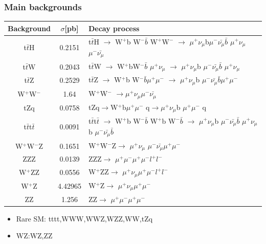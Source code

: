 \documentclass[11pt]{beamer}
\begin{document}
\begin{frame}
\frametitle{Main backgrounds}
\begin{center}
\scriptsize{
\begin{tabular}{|c|c|p{7cm}|}
	\hline
	Background & $\sigma$[pb] & Decay process \\
	\hline
t$\bar{t}$H	& 0.2151 & t$\bar{t}$H $\rightarrow$ W$^+$b W$^- \bar{b}$ W$^+$W$^-$ $\rightarrow$ $\mu^+ \nu_\mu$b$\mu^- \bar{\nu_\mu}\bar{b}$ $\mu^+\nu_\mu$ $\mu^-\bar{\nu_\mu}$\\
\hline  
t$\bar{t}$W  &0.2043 &t$\bar{t}$W  $\rightarrow$  W$^+$bW$^- \bar{b}$ $\mu^+\nu_\mu$ $\rightarrow$ $\mu^+ \nu_\mu$b $\mu^- \bar{\nu_\mu} \bar{b}$ $\mu^+ \nu_\mu$\\
\hline
 t$\bar{t}$Z & 0.2529 & t$\bar{t}$Z  $\rightarrow$ W$^+$b  W$^-$$\bar{b} \mu^+ \mu^-$ $\rightarrow$ $\mu^+ \nu_\mu$b $\mu^- \bar{\nu_\mu} \bar{b}\mu^+ \mu^-$  \\
 \hline 
  W$^+$W$^-$  &1.64 & W$^+$W$^-$ $\rightarrow$$\mu^+\nu_\mu$$\mu^-\bar{\nu_\mu}$ \\
    \hline 
  tZq  &0.0758 & tZq$\rightarrow$W$^+$b$\mu^+ \mu^-$ q$\rightarrow$$\mu^+ \nu_\mu$b $\mu^+\mu^-$ q \\
    \hline 
  t$\bar{t}$t$\bar{t}$  & 0.0091&t$\bar{t}$t$\bar{t}$ $\rightarrow$ W$^+$b   W$^- \bar{b}$  W$^+$b  W$^- \bar{b}$   $\rightarrow$ $\mu^+ \nu_\mu$b $\mu^- \bar{\nu_\mu} \bar{b}$ $\mu^+ \nu_\mu$b   $\mu^- \bar{\nu_\mu} \bar{b}$ \\
    \hline 
  W$^+$W$^-$Z  & 0.1651& W$^+$W$^-$Z$\rightarrow$ $\mu^+ \nu_\mu$ $\mu^- \bar{\nu_\mu} \mu^+ \mu^-$\\
    \hline 
 ZZZ  &0.0139 & ZZZ$\rightarrow$ $\mu^+ \mu^-\mu^+ \mu^-l^+ l^-$  \\
    \hline 
  W$^+$ZZ  & 0.0556&W$^+$ZZ$\rightarrow$ $\mu^+ \nu_\mu \mu^+ \mu^- l^+l^-$ \\
  \hline 
 W$^+$Z &4.42965 &W$^+$Z$\rightarrow$ $\mu^+ \nu_\mu \mu^+ \mu^-$ \\
 \hline
ZZ &  1.256 &ZZ$\rightarrow$ $\mu^+ \mu^- \mu^+ \mu^-$ \\
 \hline
\end{tabular}
}
\end{center}
\tiny{
\begin{itemize}
	\item Rare SM: tttt,WWW,WWZ,WZZ,WW,tZq
	\item WZ:WZ,ZZ
\end{itemize}}
\end{frame}
\end{document}
